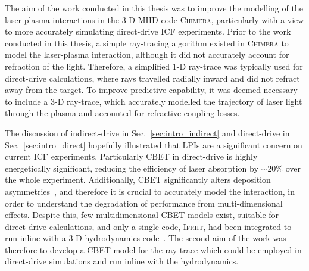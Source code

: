 The aim of the work conducted in this thesis was to improve the modelling of the laser-plasma interactions in the 3-D \ac{MHD} code \textsc{Chimera}, particularly with a view to more accurately simulating direct-drive \ac{ICF} experiments.
Prior to the work conducted in this thesis, a simple ray-tracing algorithm existed in \textsc{Chimera} to model the laser-plasma interaction, although it did not accurately account for refraction of the light.
Therefore, a simplified 1-D ray-trace was typically used for direct-drive calculations, where rays travelled radially inward and did not refract away from the target.
To improve predictive capability, it was deemed necessary to include a 3-D ray-trace, which accurately modelled the trajectory of laser light through the plasma and accounted for refractive coupling losses.

The discussion of indirect-drive in Sec.~\ref{sec:intro_indirect} and direct-drive in Sec.~\ref{sec:intro_direct} hopefully illustrated that \ac{LPIs} are a significant concern on current \ac{ICF} experiments.
Particularly \ac{CBET} in direct-drive is highly energetically significant, reducing the efficiency of laser absorption by $\sim20\%$ over the whole experiment.
Additionally, \ac{CBET} significantly alters deposition asymmetries~\cite{colaitis_inverse_2021}, and therefore it is crucial to accurately model the interaction, in order to understand the degradation of performance from multi-dimensional effects.
Despite this, few multidimensional \ac{CBET} models exist, suitable for direct-drive calculations, and only a single code, \textsc{Ifriit}, had been integrated to run inline with a 3-D hydrodynamics code~\cite{colaitis_inverse_2021}.
The second aim of the work was therefore to develop a \ac{CBET} model for the ray-trace which could be employed in direct-drive simulations and run inline with the hydrodynamics.

